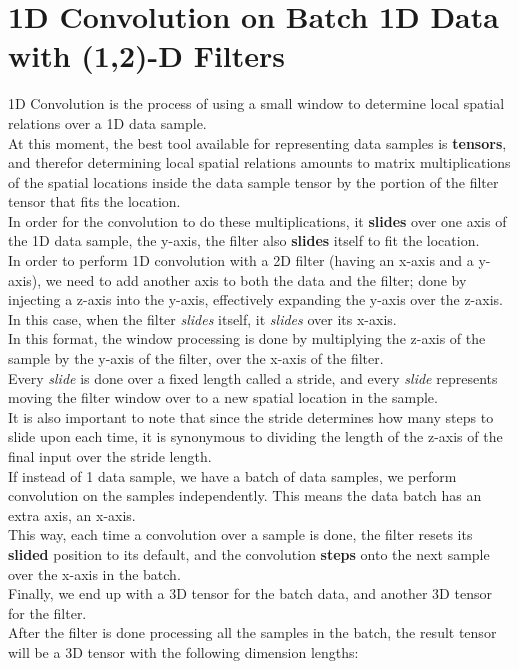 \documentclass[a4paper, 12pt]{report}
\begin{document}
\section{\textbf{1D Convolution on Batch 1D Data with (1,2)-D Filters}}
1D Convolution is the process of using a small window to determine local spatial relations over a 1D data sample.\\
At this moment, the best tool available for representing data samples is \textbf{tensors}, and therefor determining local spatial relations amounts to matrix multiplications of the spatial locations inside the data sample tensor by the portion of the filter tensor that fits the location.\\
In order for the convolution to do these multiplications, it \textbf{slides} over one axis of the 1D data sample, the y-axis, the filter also \textbf{slides} itself to fit the location.\\
In order to perform 1D convolution with a 2D filter (having an x-axis and a y-axis), we need to add another axis to both the data and the filter; done by injecting a z-axis into the y-axis, effectively expanding the y-axis over the z-axis. In this case, when the filter \textit{slides} itself, it \textit{slides} over its x-axis.\\
In this format, the window processing is done by multiplying the z-axis of the sample by the y-axis of the filter, over the x-axis of the filter.\\
Every \textit{slide} is done over a fixed length called a stride, and every \textit{slide} represents moving the filter window over to a new spatial location in the sample.\\
It is also important to note that since the stride determines how many steps to slide upon each time, it is synonymous to dividing the length of the z-axis of the final input over the stride length.\\
If instead of 1 data sample, we have a batch of data samples, we perform convolution on the samples independently. This means the data batch has an extra axis, an x-axis.\\
This way, each time a convolution over a sample is done, the filter resets its \textbf{slided} position to its default, and the convolution \textbf{steps} onto the next sample over the x-axis in the batch.\\
Finally, we end up with a 3D tensor for the batch data, and another 3D tensor for the filter.\\
After the filter is done processing all the samples in the batch, the result tensor will be a 3D tensor with the following dimension lengths:
\end{document}
